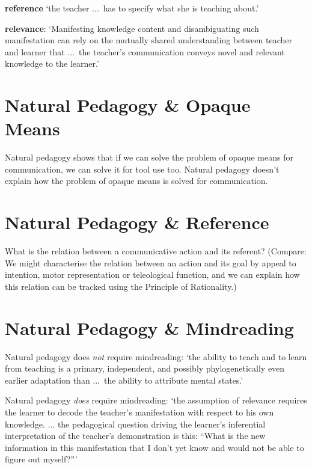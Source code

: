 \documentclass[11pt]{extarticle}
\begin{document}
\begin{multicols}{3}
\textbf{reference} `the teacher ...\ has to specify what she is teaching about.’ \citep{Csibra:2005zr} %

\textbf{relevance}:  ‘Manifesting knowledge content and disambiguating such manifestation can rely on the mutually shared understanding between teacher and learner that ...\ the teacher's communication conveys novel and relevant knowledge to the learner.’ \citep{Csibra:2005zr} %



\section{Natural Pedagogy \& Opaque Means}
Natural pedagogy shows that if we can solve the problem of opaque means for communication, we can solve it for tool use too.
Natural pedagogy doesn't explain how the problem of opaque means is solved for communication.


\section{Natural Pedagogy \& Reference}
What is the relation between a communicative action and its referent?
(Compare: We might characterise the relation between an action and its goal by appeal to intention, motor representation or teleological function, and we can explain how this relation can be tracked using the Principle of Rationality.)



\section{Natural Pedagogy \& Mindreading}
Natural pedagogy does \emph{not} require mindreading:
‘the ability to teach and to learn from teaching is a primary, independent, and possibly phylogenetically even earlier adaptation than ...\ the ability to attribute mental states.'\citep{Gergely:2012np} %

Natural pedagogy \emph{does} require mindreading:
`the assumption of relevance requires the learner to decode the teacher's manifestation with respect to his own knowledge.  ...  the pedagogical question driving the learner's inferential interpretation of the teacher’s demonstration is this: ``What is the new information in this manifestation that I don’t yet know and would not be able to figure out myself?'''\citep{Csibra:2005zr} %


\end{multicols}
\end{document}
